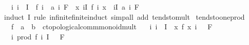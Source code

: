 \begin{isabellebody}
\ \ \ {\isachardoublequoteopen}{\isacharparenleft}{\kern0pt}{\isasymAnd}i{\isachardot}{\kern0pt}\ i\ {\isasymin}\ I\ {\isasymLongrightarrow}\ {\isacharparenleft}{\kern0pt}f\ i\ {\isasymlonglongrightarrow}\ a\ i{\isacharparenright}{\kern0pt}\ F{\isacharparenright}{\kern0pt}\ {\isasymLongrightarrow}\ {\isacharparenleft}{\kern0pt}{\isacharparenleft}{\kern0pt}{\isasymlambda}x{\isachardot}{\kern0pt}\ {\isasymProd}i{\isasymin}I{\isachardot}{\kern0pt}\ f\ i\ x{\isacharparenright}{\kern0pt}\ {\isasymlonglongrightarrow}\ {\isacharparenleft}{\kern0pt}{\isasymProd}i{\isasymin}I{\isachardot}{\kern0pt}\ a\ i{\isacharparenright}{\kern0pt}{\isacharparenright}{\kern0pt}\ F{\isachardoublequoteclose}\isanewline
%
\isadelimproof
\ \ %
\endisadelimproof
%
\isatagproof
{}\isamarkupfalse%
\ {\isacharparenleft}{\kern0pt}induct\ I\ rule{\isacharcolon}{\kern0pt}\ infinite{\isacharunderscore}{\kern0pt}finite{\isacharunderscore}{\kern0pt}induct{\isacharparenright}{\kern0pt}\ {\isacharparenleft}{\kern0pt}simp{\isacharunderscore}{\kern0pt}all\ add{\isacharcolon}{\kern0pt}\ tendsto{\isacharunderscore}{\kern0pt}mult{\isacharparenright}{\kern0pt}%
\endisatagproof
{\isafoldproof}%
%
\isadelimproof
\isanewline
%
\endisadelimproof
\isanewline
{}\isamarkupfalse%
\ tendsto{\isacharunderscore}{\kern0pt}one{\isacharunderscore}{\kern0pt}prod{\isacharprime}{\kern0pt}{\isacharcolon}{\kern0pt}\isanewline
\ \ \ f\ {\isacharcolon}{\kern0pt}{\isacharcolon}{\kern0pt}\ {\isachardoublequoteopen}{\isacharprime}{\kern0pt}a\ {\isasymRightarrow}\ {\isacharprime}{\kern0pt}b\ {\isasymRightarrow}\ {\isacharprime}{\kern0pt}c{\isacharcolon}{\kern0pt}{\isacharcolon}{\kern0pt}topological{\isacharunderscore}{\kern0pt}comm{\isacharunderscore}{\kern0pt}monoid{\isacharunderscore}{\kern0pt}mult{\isachardoublequoteclose}\isanewline
\ \ \ {\isachardoublequoteopen}{\isasymAnd}i{\isachardot}{\kern0pt}\ i\ {\isasymin}\ I\ {\isasymLongrightarrow}\ {\isacharparenleft}{\kern0pt}{\isacharparenleft}{\kern0pt}{\isasymlambda}x{\isachardot}{\kern0pt}\ f\ x\ i{\isacharparenright}{\kern0pt}\ {\isasymlonglongrightarrow}\ {}{\isacharparenright}{\kern0pt}\ F{\isachardoublequoteclose}\isanewline
\ \ \ {\isachardoublequoteopen}{\isacharparenleft}{\kern0pt}{\isacharparenleft}{\kern0pt}{\isasymlambda}i{\isachardot}{\kern0pt}\ prod\ {\isacharparenleft}{\kern0pt}f\ i{\isacharparenright}{\kern0pt}\ I{\isacharparenright}{\kern0pt}\ {\isasymlonglongrightarrow}\ {}{\isacharparenright}{\kern0pt}\ F{\isachardoublequoteclose}\isanewline

\end{isabellebody}
